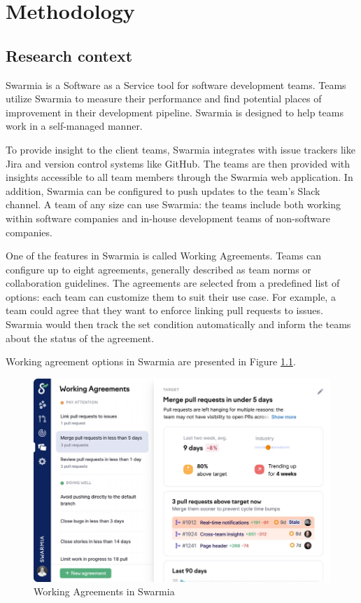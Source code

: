 
\chapter{Methodology}

\section{Research context}

Swarmia is a Software as a Service tool for software development teams. Teams utilize Swarmia to measure their performance and find potential places of improvement in their development pipeline. Swarmia is designed to help teams work in a self-managed manner.

To provide insight to the client teams, Swarmia integrates with issue trackers like Jira and version control systems like GitHub. The teams are then provided with insights accessible to all team members through the Swarmia web application. In addition, Swarmia can be configured to push updates to the team's Slack channel. A team of any size can use Swarmia: the teams include both working within software companies and in-house development teams of non-software companies. 

One of the features in Swarmia is called Working Agreements. Teams can configure up to eight agreements, generally described as team norms or collaboration guidelines. The agreements are selected from a predefined list of options: each team can customize them to suit their use case. For example, a team could agree that they want to enforce linking pull requests to issues. Swarmia would then track the set condition automatically and inform the teams about the status of the agreement. 

Working agreement options in Swarmia are presented in Figure \ref{fig:WorkingAgreements}.



\begin{figure}[h]
    \begin{center}
        \includegraphics[width=13.5cm]{LaTeX/images/improvement.png}
        \caption{Working Agreements in Swarmia}
        \label{fig:WorkingAgreements}
    \end{center}
\end{figure}

